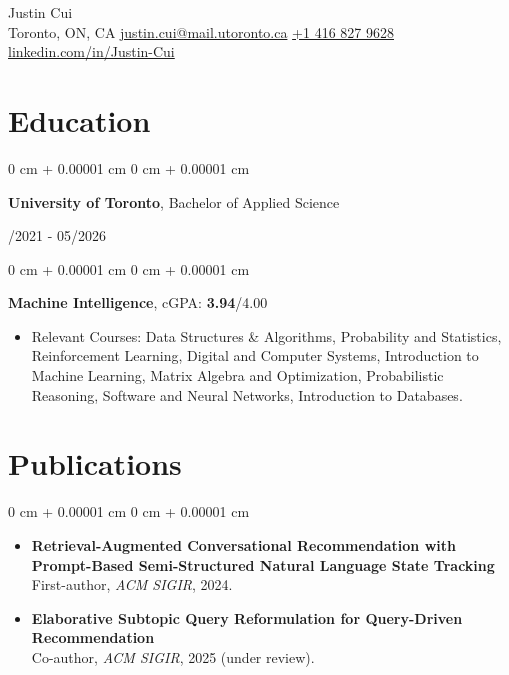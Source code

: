 \documentclass[11pt, letterpaper]{article}
\makeatletter
\newenvironment{highlights}{
    \begin{itemize}[
        topsep=0.08 cm,
        parsep=0.08 cm,
        partopsep=0pt,
        itemsep=0pt,
        leftmargin=0.2 cm + 17pt
    ]
}
{
    \end{itemize}
}
\newenvironment{onecolentry}{
    \begin{adjustwidth}{
        0 cm + 0.00001 cm
    }{
        0 cm + 0.00001 cm
    }
}{
    \end{adjustwidth}
}
\newenvironment{twocolentry}[2][]{
    \onecolentry
    \def\secondColumn{#2}
    \setcolumnwidth{\fill, 4.5 cm}
    \begin{paracol}{2}
}{
    \switchcolumn \raggedleft \secondColumn
    \end{paracol}
    \endonecolentry
}
\newcommand{\contactinfo}{
    \centering
    {\fontsize{25pt}{25pt}\selectfont Justin Cui} \\[4pt]
    \vspace{0.3cm}
    \small Toronto, ON, CA \hfill
    \href{mailto:justin.cui@mail.utoronto.ca}{justin.cui@mail.utoronto.ca} \hfill
    \href{tel:+1-416-827-9628}{+1 416 827 9628} \hfill
    \href{https://linkedin.com/in/Justin-Cui}{linkedin.com/in/Justin-Cui} \\
}
\makeatother
\begin{document}
\contactinfo
\vspace{2pt}

\section{Education}
\vspace{0.08 cm}
\begin{twocolentry}{09/2021 - 05/2026}
    {\textbf{University of Toronto}}, Bachelor of Applied Science
\end{twocolentry}
\vspace{0.11cm}
\begin{onecolentry}
\hspace{0.3cm}\textbf{Machine Intelligence},  cGPA: {\textbf{3.94}}/4.00
\vspace{0.07cm}
    \begin{highlights}
        \item Relevant Courses: Data Structures \& Algorithms, Probability and Statistics, Reinforcement Learning, Digital and Computer Systems, Introduction to Machine Learning, Matrix Algebra and Optimization, Probabilistic Reasoning, Software and Neural Networks, Introduction to Databases.
    \end{highlights}
\end{onecolentry}

\section{Publications}
\vspace{0.08 cm}
\begin{onecolentry}
    \begin{highlights}
    \item \textbf{Retrieval-Augmented Conversational Recommendation with Prompt-Based Semi-Structured Natural Language State Tracking} \\
    First-author, \textit{ACM SIGIR}, 2024.
    \vspace{0.1cm}
    \item \textbf{Elaborative Subtopic Query Reformulation for Query-Driven Recommendation} \\
    Co-author, \textit{ACM SIGIR}, 2025 (under review).
    \end{highlights}
\end{onecolentry}
\end{document}
